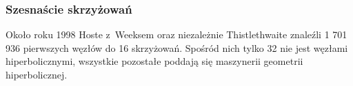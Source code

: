 
\subsubsection{Szesnaście skrzyżowań}
Około roku 1998 Hoste z~Weeksem oraz niezależnie Thistlethwaite \cite{thistlethwaite1998} znaleźli 1 701 936 pierwszych węzłów do 16 skrzyżowań.
%
%
%
Spośród nich tylko 32 nie jest węzłami hiperbolicznymi, wszystkie pozostałe poddają się maszynerii geometrii hiperbolicznej.

